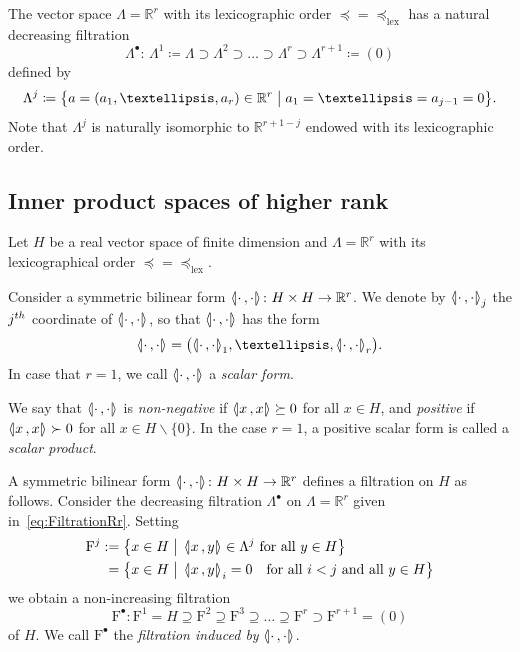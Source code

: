 \documentclass[10pt,a4paper]{amsart}
\newcommand{\llangle}{\mathopen{\langle\mkern -3.1mu\lvert}}
\newcommand{\rrangle}{\mathclose{\rvert\mkern -3.1mu\rangle}}
\newcommand{\highinn}[2]{{\llangle#2\rrangle_{#1}}}
\newcommand{\filter}{\mathrm{F}}
\newcommand{\R}{\mathbb{R}}
\renewcommand{\setminus}{\smallsetminus}
\newcommand{\lexeq}{\preceq_{\mathrm{lex}}}
\renewcommand*{\to}{\mathchoice{\longrightarrow}{\rightarrow}{\rightarrow}{\rightarrow}}
\newcommand*{\Mk}{\mkern -2mu}
\newcommand*{\MK}{\mkern 2mu}
\theoremstyle{definition}\newtheorem{defi}[cdrthm]{Definition}
\begin{document}
The vector space $\Lambda = \R^r$ with its lexicographic order $\preceq=\lexeq$ has a natural decreasing filtration
\begin{equation}\label{eq:FiltrationRr}
\Lambda^\bullet \colon \, \Lambda^1 \coloneq \Lambda\supset \Lambda^2 \supset \dots \supset \Lambda^{r} \supset \Lambda^{r+1} \coloneq (0)
\end{equation}
defined by
\[
\Lambda^j \coloneqq \bigl\{a = (a_1, \dots, a_r) \in \R^r \bigm| a_1 = \dots =a_{j-1}=0\bigr\}.
\]
Note that $\Lambda^j$ is naturally isomorphic to $\R^{r+1-j}$ endowed with its lexicographic order.



\subsection{Inner product spaces of higher rank}

Let $H$ be a real vector space of finite dimension and $\Lambda =\R^r$ with its lexicographical order $\preceq=\lexeq$.

Consider a symmetric bilinear form $\highinn{}{\cdot \,, \cdot} \colon H \times H \to \R^r$. We denote by $\highinn{j}{\cdot\,, \cdot}$ the $j^{\rm th}$ coordinate of $\highinn{}{\cdot\,,\cdot}$, so that $\highinn{}{\cdot\,,\cdot}$ has the form
\[
\highinn{}{\cdot\,,\cdot} = \bigl(\highinn{1}{\cdot\,, \cdot}, \dots, \highinn{r}{\cdot\,, \cdot}\bigr).
\]
In case that $r=1$, we call $\highinn{}{\cdot \,, \cdot}$ a \emph{scalar form}.

We say that $\highinn{}{\cdot \,, \cdot}$ is \emph{non-negative} if $\highinn{}{x\,, x} \succeq 0$ for all $x \in H$, and \emph{positive} if $\highinn{}{x\,, x} \succ 0$ for all $x \in H \setminus \{0\}$. In the case $r=1$, a positive scalar form is called a \emph{scalar product}.

A symmetric bilinear form $\highinn{}{\cdot \,, \cdot} \colon H \times H \to \R^r$ defines a filtration on $H$ as follows. Consider the decreasing filtration $\Lambda^\bullet$ on $\Lambda = \R^r$ given in~\eqref{eq:FiltrationRr}. Setting
\begin{align}
\filter^j \,\MK &\!\Mk:= \bigl\{ x \in H \bigm| \,\highinn{}{x \,, y} \in \Lambda^j \text{ for all }y \in H\bigr\}\\
&= \bigl\{ x \in H \bigm| \,\highinn{}{x \,, y}_i = 0 \quad\text{for all }i <j\text{  and all }y \in H\bigr\}
\end{align}
we obtain a non-increasing filtration
\[
\filter^\bullet\colon \filter^1 = H \supseteq \filter^2 \supseteq \filter^3 \supseteq \dots \supseteq \filter^r \supset \filter^{r+1} = (0)
\]
of $H$. We call $\filter^\bullet$ the \emph{filtration induced by} $\highinn{}{\cdot \,, \cdot}$.
\end{document}
